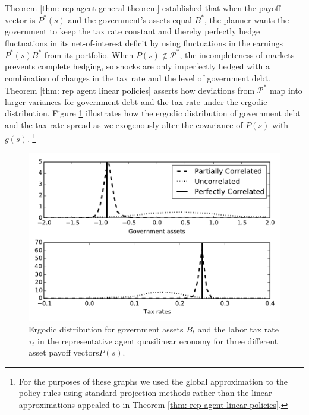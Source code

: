 \documentclass[thmsb,11pt]{article}
\begin{document}
 Theorem \ref{thm: rep agent general theorem} established  that when the payoff vector is $P^*(s)$ and the government's assets equal $B^*$, the
 planner  wants the government  to keep the tax rate constant and thereby perfectly  hedge fluctuations in its net-of-interest deficit
by using fluctuations in the earnings  $P^*(s)B^*$ from its  portfolio.  When $P(s) \not \in \mathcal{P}^*$, the incompleteness of markets prevents complete hedging, so  shocks are only imperfectly
hedged with a combination of changes in the tax rate
and the level of government debt. Theorem \ref{thm: rep agent linear policies}  asserts   how  deviations from $\mathcal{P}^*$ map into larger variances for government debt and the tax rate
under the ergodic distribution. Figure \ref{fig: ergodic distribution ql} illustrates  how the ergodic distribution of government debt and the tax rate spread as we
exogenously alter  the covariance of $P(s)$ with $g(s)$. \footnote{For the purposes of these graphs we used the global approximation to the policy rules using standard projection methods rather than the linear approximations appealed to in Theorem \ref{thm: rep agent linear policies}.}
 \begin{figure}[htp]
 \centering
	 \includegraphics[width=7in]{plots/ErgodicQL.pdf}
 \caption{Ergodic distribution for government assets $B_t$ and the labor tax rate $\tau_t$ in the representative agent quasilinear economy for three different
 asset payoff vectors$P(s)$.}
 \label{fig: ergodic distribution ql}
 \end{figure}
\end{document}
